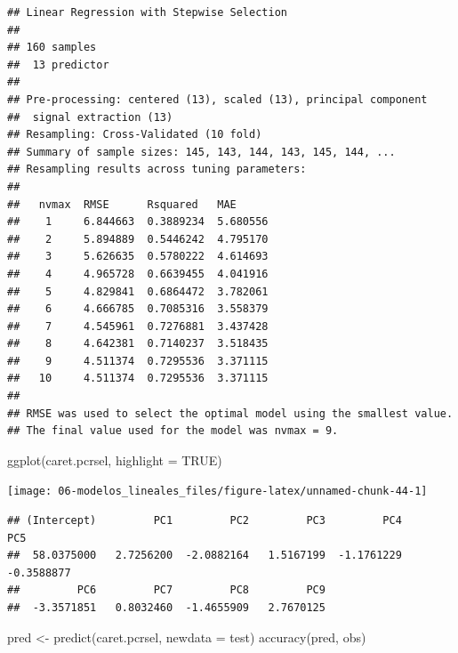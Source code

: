 \documentclass[
]{book}
\newenvironment{Shaded}{\begin{snugshade}}{\end{snugshade}}
\newcommand{\AttributeTok}[1]{\textcolor[rgb]{0.77,0.63,0.00}{#1}}
\newcommand{\ConstantTok}[1]{\textcolor[rgb]{0.00,0.00,0.00}{#1}}
\newcommand{\FunctionTok}[1]{\textcolor[rgb]{0.00,0.00,0.00}{#1}}
\newcommand{\NormalTok}[1]{#1}
\newcommand{\OtherTok}[1]{\textcolor[rgb]{0.56,0.35,0.01}{#1}}
\newcommand{\SpecialCharTok}[1]{\textcolor[rgb]{0.00,0.00,0.00}{#1}}
\theoremstyle{break}
\theoremstyle{definition}
\theoremstyle{definition}
\theoremstyle{definition}
\theoremstyle{definition}
\theoremstyle{remark}
\begin{document}
\begin{verbatim}
## Linear Regression with Stepwise Selection 
## 
## 160 samples
##  13 predictor
## 
## Pre-processing: centered (13), scaled (13), principal component
##  signal extraction (13) 
## Resampling: Cross-Validated (10 fold) 
## Summary of sample sizes: 145, 143, 144, 143, 145, 144, ... 
## Resampling results across tuning parameters:
## 
##   nvmax  RMSE      Rsquared   MAE     
##    1     6.844663  0.3889234  5.680556
##    2     5.894889  0.5446242  4.795170
##    3     5.626635  0.5780222  4.614693
##    4     4.965728  0.6639455  4.041916
##    5     4.829841  0.6864472  3.782061
##    6     4.666785  0.7085316  3.558379
##    7     4.545961  0.7276881  3.437428
##    8     4.642381  0.7140237  3.518435
##    9     4.511374  0.7295536  3.371115
##   10     4.511374  0.7295536  3.371115
## 
## RMSE was used to select the optimal model using the smallest value.
## The final value used for the model was nvmax = 9.
\end{verbatim}

\begin{Shaded}
\begin{Highlighting}[]
\FunctionTok{ggplot}\NormalTok{(caret.pcrsel, }\AttributeTok{highlight =} \ConstantTok{TRUE}\NormalTok{)}
\end{Highlighting}
\end{Shaded}

\begin{center}\texttt{[image: 06-modelos\_lineales\_files/figure-latex/unnamed-chunk-44-1]} \end{center}

\begin{Shaded}
\end{Shaded}

\begin{verbatim}
## (Intercept)         PC1         PC2         PC3         PC4         PC5 
##  58.0375000   2.7256200  -2.0882164   1.5167199  -1.1761229  -0.3588877 
##         PC6         PC7         PC8         PC9 
##  -3.3571851   0.8032460  -1.4655909   2.7670125
\end{verbatim}

\begin{Shaded}
\begin{Highlighting}[]
\NormalTok{pred }\OtherTok{\textless{}{-}} \FunctionTok{predict}\NormalTok{(caret.pcrsel, }\AttributeTok{newdata =}\NormalTok{ test)}
\FunctionTok{accuracy}\NormalTok{(pred, obs)}
\end{Highlighting}
\end{Shaded}
\end{document}
